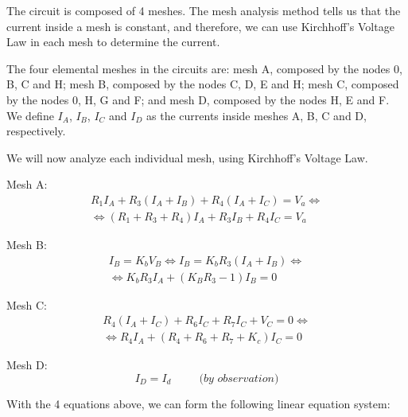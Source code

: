 \hspace{12pt} The circuit is composed of 4 meshes. The mesh analysis method tells us that the current inside a mesh is constant, and therefore, we can use Kirchhoff's Voltage Law in each mesh to determine the current.

The four elemental meshes in the circuits are: mesh A, composed by the nodes 0, B, C and H; mesh B, composed by the nodes C, D, E and H; mesh C, composed by the nodes 0, H, G and F; and mesh D, composed by the nodes H, E and F. We define $I_A$, $I_B$, $I_C$ and $I_D$ as the currents inside meshes A, B, C and D, respectively. 

We will now analyze each individual mesh, using Kirchhoff's Voltage Law.
\vspace{10pt}

Mesh A:
\begin{equation}
    \begin{split}
        R_1I_A+R_3(I_A+I_B)+R_4(I_A+I_C)=V_a \iff \\
        \iff (R_1+R_3+R_4)I_A+R_3I_B+R_4I_C=V_a
    \end{split}
\end{equation}

Mesh B:
\begin{equation}
    \begin{split}
        I_B=K_bV_B \iff I_B=K_bR_3(I_A+I_B) \iff \\
        \iff K_bR_3I_A+(K_BR_3-1)I_B=0
    \end{split}
\end{equation}

Mesh C:
\begin{equation}
    \begin{split}
        R_4(I_A+I_C)+R_6I_C+R_7I_C+V_C=0 \iff \\
        \iff R_4I_A+(R_4+R_6+R_7+K_c)I_C=0
    \end{split}
\end{equation}

Mesh D:
\begin{equation}
    I_D=I_d  \hspace{30pt} \textit{(by observation)}
\end{equation}

\vspace{20pt}
With the 4 equations above, we can form the following linear equation system:
\vspace{20pt}

